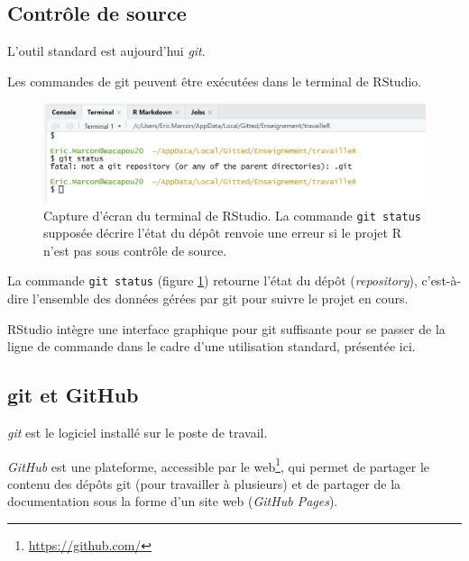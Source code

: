 \documentclass[
  11pt,
  french,
  a4paper,
  extrafontsizes,onecolumn,openright
  ]{memoir}
\begin{document}
\hypertarget{sec:git-cds}{%
\subsection{Contrôle de source}\label{sec:git-cds}}

L'outil standard est aujourd'hui \emph{git}.

Les commandes de git peuvent être exécutées dans le terminal de RStudio.



\scriptsize

\begin{figure}

{\centering \includegraphics[width=0.8\linewidth]{images/git-Status} 

}

\caption{Capture d'écran du terminal de RStudio. La commande \texttt{git\ status} supposée décrire l'état du dépôt renvoie une erreur si le projet R n'est pas sous contrôle de source.}\label{fig:git-Status}
\end{figure}

\normalsize

La commande \texttt{git\ status} (figure \ref{fig:git-Status}) retourne l'état du dépôt (\emph{repository}), c'est-à-dire l'ensemble des données gérées par git pour suivre le projet en cours.

RStudio intègre une interface graphique pour git suffisante pour se passer de la ligne de commande dans le cadre d'une utilisation standard, présentée ici.

\hypertarget{git-et-github}{%
\subsection{git et GitHub}\label{git-et-github}}

\emph{git} est le logiciel installé sur le poste de travail.

\emph{GitHub} est une plateforme, accessible par le web\footnote{\url{https://github.com/}}, qui permet de partager le contenu des dépôts git (pour travailler à plusieurs) et de partager de la documentation sous la forme d'un site web (\emph{GitHub Pages}).
\end{document}
